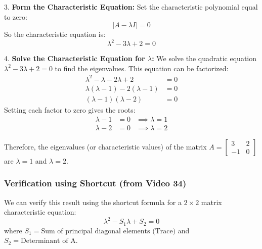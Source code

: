 \documentclass{article}
\begin{document}
3.  \textbf{Form the Characteristic Equation:}
    Set the characteristic polynomial equal to zero:
    \[ |A - \lambda I| = 0 \]
    So the characteristic equation is:
    \[ \lambda^2 - 3\lambda + 2 = 0 \]

4.  \textbf{Solve the Characteristic Equation for $\lambda$:}
    We solve the quadratic equation $\lambda^2 - 3\lambda + 2 = 0$ to find the eigenvalues. This equation can be factorized:
    \begin{align*} \lambda^2 - \lambda - 2\lambda + 2 &= 0 \\ \lambda(\lambda - 1) - 2(\lambda - 1) &= 0 \\ (\lambda - 1)(\lambda - 2) &= 0 \end{align*}
    Setting each factor to zero gives the roots:
    \begin{align*} \lambda - 1 &= 0 &\implies \lambda = 1 \\ \lambda - 2 &= 0 &\implies \lambda = 2 \end{align*}

Therefore, the eigenvalues (or characteristic values) of the matrix $A = \begin{bmatrix} 3 & 2 \\ -1 & 0 \end{bmatrix}$ are $\lambda = 1$ and $\lambda = 2$.

\subsubsection*{Verification using Shortcut (from Video 34)} %
We can verify this result using the shortcut formula for a $2 \times 2$ matrix characteristic equation:
\[ \lambda^2 - S_1 \lambda + S_2 = 0 \]
where $S_1 = \text{Sum of principal diagonal elements (Trace)}$ and $S_2 = \text{Determinant of A}$.
\end{document}
